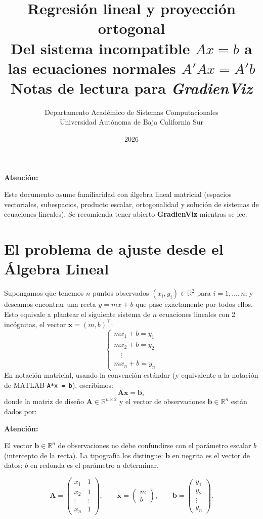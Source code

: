 ﻿\documentclass[12pt, a4paper]{article}
\title{
    {\Large\bfseries Regresión lineal y proyección ortogonal}\\[0.4em]
    {\large Del sistema incompatible $Ax = b$ a las ecuaciones normales $A'Ax = A'b$}\\[0.8em]
    {\normalsize Notas de lectura para \textit{GradienViz}}
}
\author{
    Departamento Académico de Sistemas Computacionales\\
    Universidad Autónoma de Baja California Sur
}
\date{2026}
\newenvironment{vizadv}{%
    \begin{mdframed}[style=viznaranja]
    \textbf{\color{bordeadv}Atención:}\quad
}{%
    \end{mdframed}
}
\newcommand{\R}{\mathbb{R}}
\newcommand{\T}{{\top}}
\begin{document}
\maketitle
\tableofcontents
\vspace{1em}

\begin{vizadv}
Este documento asume familiaridad con álgebra lineal matricial (espacios vectoriales, subespacios, producto escalar, ortogonalidad y solución de sistemas de ecuaciones lineales). Se recomienda tener abierto \textbf{GradienViz} mientras se lee.
\end{vizadv}

\section{El problema de ajuste desde el Álgebra Lineal}

Supongamos que tenemos $n$ puntos observados $(x_i, y_i) \in \R^2$ para $i = 1, \ldots, n$, y deseamos encontrar una recta $y = mx + b$ que pase exactamente por todos ellos. Esto equivale a plantear el siguiente sistema de $n$ ecuaciones lineales con 2 incógnitas, el vector $\mathbf{x} = (m, b)^\T$:
\[
    \begin{cases}
        m x_1 + b = y_1 \\
        m x_2 + b = y_2 \\
        \quad \vdots \\
        m x_n + b = y_n
    \end{cases}
\]
En notación matricial, usando la convención estándar (y equivalente a la notación de MATLAB \texttt{A*x = b}), escribimos:
\begin{equation}\label{eq:sistema_incompatible}
    \mathbf{A}\mathbf{x} = \mathbf{b},
\end{equation}
donde la matriz de diseño $\mathbf{A} \in \R^{n \times 2}$ y el vector de observaciones $\mathbf{b} \in \R^n$ están dados por:

\begin{vizadv}
El vector $\mathbf{b} \in \R^n$ de observaciones no debe confundirse con el parámetro escalar $b$ (intercepto de la recta). La tipografía los distingue: $\mathbf{b}$ en negrita es el vector de datos; $b$ en redonda es el parámetro a determinar.
\end{vizadv}
\[
    \mathbf{A} = \begin{pmatrix}
        x_1 & 1 \\
        x_2 & 1 \\
        \vdots & \vdots \\
        x_n & 1
    \end{pmatrix}, \qquad
    \mathbf{x} = \begin{pmatrix}
        m \\ b
    \end{pmatrix}, \qquad
    \mathbf{b} = \begin{pmatrix}
        y_1 \\ y_2 \\ \vdots \\ y_n
    \end{pmatrix}.
\]
\end{document}
